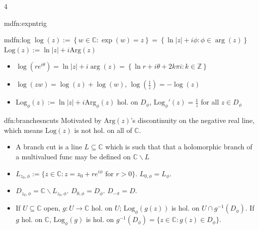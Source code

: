 \documentclass[landscape, 8pt]{extarticle}
\begin{document}
\begin{multicols*}{4}
\begin{mdfn}{mdfn:expntrig}{ }
		\end{mdfn}
		
		
		\begin{mdfn}{mdfn:log}{ }
			$\log(z) := \left\{w \in \mathbb{C} : \exp(w) = z\right\} = \left\{ \ln \left|z\right| + i\phi : \phi \in \arg(z)\right\}$ \\
			$\text{Log}(z) := \ln\left|z\right| + i \text{Arg}(z)$
			\begin{itemize}
				\item $\log(re^{i\theta}) = \ln\left|z\right| + i \arg(z) = \left\{\ln r + i\theta + 2k\pi i: k\in \mathbb{Z}\right\}$
				\item $\log(zw) = \log(z) + \log(w)$, $\log(\frac{1}{z}) = -\log(z)$
				\item $\text{Log}_\phi(z) := \ln \left|z\right| + i \text{Arg}_\phi(z)$ hol. on $D_\phi$, $\text{Log}_\phi'(z) = \frac{1}{z}$ for all $z \in D_\phi$
			\end{itemize}
			
			
			
		\end{mdfn}
		
		
		\begin{dfn}{dfn:branchesncuts}{ }
			Motivated by $\text{Arg}(z)$'s discontinuity on the negative real line, \\
			which means $\text{Log}(z)$ is not hol. on all of $\mathbb{C}$.
			\begin{itemize}
				\item A branch cut is a line $L \subseteq \mathbb{C}$ which is such that that a holomorphic branch of a multivalued func may be defined on $\mathbb{C} \backslash L$
				\item $L_{z_0, \phi} := \{z \in \mathbb{C} : z = z_0 + r e^{i \phi} \text{ for } r>0\}$. $L_{0, \phi} = L_\phi$.
				\item $D_{z_0, \phi} = \mathbb{C} \backslash L_{z_0, \phi}$. $D_{0, \phi} = D_\phi$. $D_{-\pi} = D$.
				\item If $U \subseteq\mathbb{C}$ open, $g:U \to \mathbb{C}$ hol. on $U$; $\text{Log}_\phi(g(z))$ is hol. on $U\cap g^{-1}(D_\phi)$. If $g$ hol. on $\mathbb{C}$, $\text{Log}_\phi(g)$ is hol. on $g^{-1}(D_\phi) = \{z\in \mathbb{C} : g(z)\in D_\phi\}$.
			\end{itemize}
			
			
		\end{dfn}
		

\end{multicols*}
\end{document}
